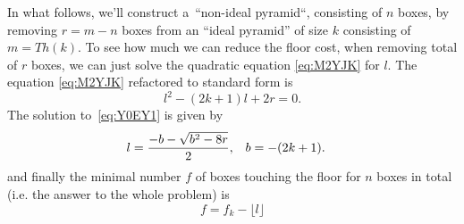 \documentclass[paper=a4,DIV=12]{leetcode}
\begin{document}
In what follows, we'll construct a~``non-ideal pyramid``, consisting of $n$
boxes, by removing $r = m - n$ boxes from an ``ideal pyramid'' of size $k$
consisting of $m = Th(k)$. To see how much we can reduce the floor cost, when
removing total of $r$ boxes, we can just solve the quadratic equation
\eqref{eq:M2YJK} for $l$. The equation \eqref{eq:M2YJK} refactored to standard
form is
\begin{equation}
  l^2 - (2k + 1) l  + 2 r = 0.
  \label{eq:Y0EY1}
\end{equation}
The solution to~\eqref{eq:Y0EY1} is given by
\begin{equation}
    \\
  \begin{aligned}
    & l = \frac{-b - \sqrt{b^2 - 8r}}{2}, & b = - (2 k + 1). &
  \end{aligned}
  \label{eq:NY9OF}
\end{equation}
and finally the minimal number $f$ of boxes touching the floor for $n$ boxes in
total (i.e. the answer to the whole problem) is
\begin{equation}
  f = f_k - \lfloor{l}\rfloor
 \label{eq:R6NHF}
\end{equation}




\end{document}
